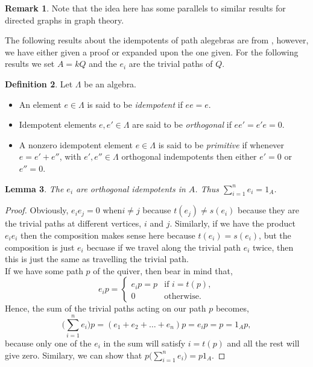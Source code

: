 \documentclass[11.5pt, twoside, a4paper, titlepage]{report}
\theoremstyle{definition}
\newtheorem{mydef}{Definition}[section]
\newtheorem{rem}[mydef]{Remark}
\theoremstyle{plain}
\newtheorem{lem}[mydef]{Lemma}
\begin{document}
\begin{rem}
Note that the idea here has some parallels to similar results for directed graphs in graph theory.
\end{rem}

The following results about the idempotents of path alegebras are from \cite{CB2}, however, we have either given a proof or expanded upon the one given. For the following results we set $A=kQ$ and the $e_i$ are the trivial paths of $Q$.

\begin{mydef} 
Let $\Lambda$ be an algebra.
\begin{itemize}
\item An element $e\in \Lambda$ is said to be \emph{idempotent} if $ee=e$.
\item Idempotent elements $e,e'\in \Lambda$ are said to be \emph{orthogonal} if $ee'=e'e=0$.
\item A nonzero idempotent element $e\in \Lambda$ is said to be \emph{primitive} if whenever $e=e'+e''$, with $e',e''\in \Lambda$ orthogonal indempotents then either $e'=0$ or $e''=0$.
\end{itemize}
\end{mydef}

\begin{lem} \label{identitylem}
The $e_i$ are orthogonal idempotents in $A$. Thus $\sum_{i=1}^{n}{e_i}=1_{A}$.
\end{lem}
\begin{proof}
Obviously, $e_ie_j=0$ when$i\neq j$ because $t(e_j)\neq s(e_i)$ because they are the trivial paths at different vertices, $i$ and $j$. Similarly, if we have the product $e_ie_i$ then the composition makes sense here because $t(e_i)=s(e_i)$, but the composition is just $e_i$ becuase if we travel along the trivial path $e_i$ twice, then this is just the same as travelling the trivial path. \\
If we have some path $p$ of the quiver, then bear in mind that,
\begin{equation*}
e_ip=
\begin{cases}
e_ip=p & \text{if } i=t(p),\\
0 & \text{otherwise.}
\end{cases}
\end{equation*}
Hence, the sum of the trivial paths acting on our path $p$ becomes, 
\begin{equation*}
\big(\sum^{n}_{i=1}{e_i}\big)p=(e_1+e_2+\dots +e_n)p=e_ip=p=1_Ap,
\end{equation*}
because only one of the $e_i$ in the sum will satisfy $i=t(p)$ and all the rest will give zero. Similary, we can show that $p\big(\sum^{n}_{i=1}{e_i}\big)=p1_A$.
\end{proof}
\end{document}
